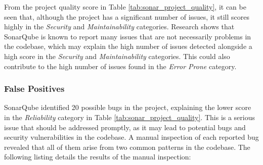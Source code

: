 \noindent From the project quality score in Table \ref{tab:sonar_project_quality}, it can be seen that, although the project has a significant number of issues, it still scores highly in the \textit{Security} and \textit{Maintainability} categories. Research shows that SonarQube is known to report many issues that are not necessarily problems in the codebase, which may explain the high number of issues detected alongside a high score in the \textit{Security} and \textit{Maintainability} categories. This could also contribute to the high number of issues found in the \textit{Error Prone} category.

\subsubsection{False Positives}

SonarQube identified 20 possible bugs in the project, explaining the lower score in the \textit{Reliability} category in Table \ref{tab:sonar_project_quality}. This is a serious issue that should be addressed promptly, as it may lead to potential bugs and security vulnerabilities in the codebase. A manual inspection of each reported bug revealed that all of them arise from two common patterns in the codebase. The following listing details the results of the manual inspection:

